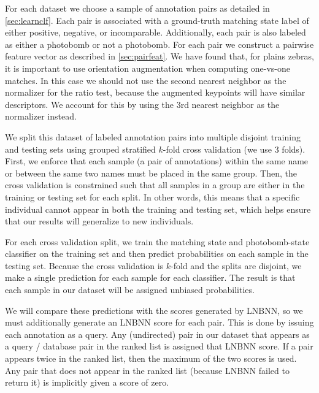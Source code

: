     For each dataset we choose a sample of annotation pairs as detailed in \cref{sec:learnclf}. Each pair is
    associated with a ground-truth matching state label of either positive, negative, or incomparable.
    Additionally, each pair is also labeled as either a photobomb or not a photobomb. For each pair we construct a
    pairwise feature vector as described in \cref{sec:pairfeat}. We have found that, for plains zebras, it is
    important to use orientation augmentation when computing one-vs-one matches. In this case we should not use the
    second nearest neighbor as the normalizer for the ratio test, because the augmented keypoints will have similar
    descriptors. We account for this by using the 3rd nearest neighbor as the normalizer instead.

    We split this dataset of labeled annotation pairs into multiple disjoint training and testing sets using
    grouped stratified $k$-fold cross validation (we use $3$ folds). First, we enforce that each sample (a pair of
    annotations) within the same name or between the same two names must be placed in the same group. Then, the
    cross validation is constrained such that all samples in a group are either in the training or testing set for
    each split. In other words, this means that a specific individual cannot appear in both the training and
    testing set, which helps ensure that our results will generalize to new individuals.

    For each cross validation split, we train the matching state and photobomb-state classifier on the training set
    and then predict probabilities on each sample in the testing set. Because the cross validation is $k$-fold and
    the splits are disjoint, we make a single prediction for each sample for each classifier. The result is that
    each sample in our dataset will be assigned unbiased probabilities.

    We will compare these predictions with the scores generated by LNBNN, so we must additionally generate an
      LNBNN score for each pair.
    This is done by issuing each annotation as a query.
    Any (undirected) pair in our dataset that appears as a query / database pair in the ranked list is assigned
      that LNBNN score.
    If a pair appears twice in the ranked list, then the maximum of the two scores is used.
    Any pair that does not appear in the ranked list (because LNBNN failed to return it) is implicitly given a
      score of zero.

